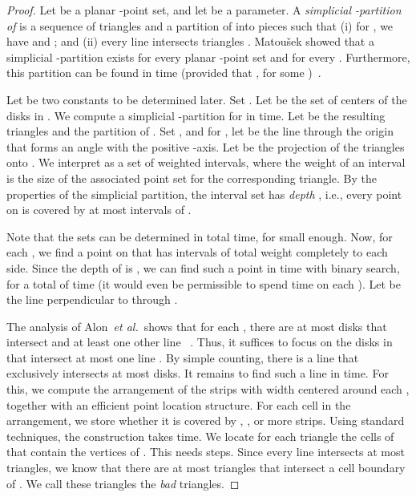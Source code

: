 \documentclass{paper}
\newcommand {\etal} {\textit {et al.}}
\begin{document}
\begin{proof}
Let  be a planar -point set, and let  be a parameter.
A \emph{simplicial -partition of } is 
a sequence  of 
 triangles and a partition  of  
into  pieces such
that  (i) for , we have 
and ; and (ii) every line  intersects 
 triangles .
Matou\v{s}ek showed that a simplicial -partition exists for every 
planar -point set and for every . 
Furthermore, this partition can be found in
 time (provided that , for 
some )~\cite[Theorem~4.7]{Matousek92}.

Let  be two constants to be determined later. Set 
. Let  be the set of centers of the disks in .
We compute a simplicial -partition for  in  time. 
Let  be the resulting triangles and
 the partition of .
Set , and for , let 
be the line through the origin that  forms an angle  with the 
positive -axis.
Let  be the projection of the triangles
 onto .
We interpret  as a set
of weighted intervals, where the weight of an interval is the size  of 
the associated point set for the corresponding triangle.
By the properties of the simplicial partition, the interval set  
has \emph{depth} ,
i.e., every point on  is covered by at most  intervals 
of .

Note that the sets  can be determined in  total time, for  small enough.
Now, for each  , we find a point  on  that has intervals of
total weight   completely to 
each side. Since the depth of
 is , we can find such a point in time  with
binary search, for a total of  time (it would even be
permissible to spend time  on each ). Let  be the line
perpendicular to  through .

The analysis of Alon~\etal\ shows that for each , there are at
most  disks that intersect  and at least one other line
~\cite[Section~2]{akp-cddsl-89}. Thus, it suffices to focus on the 
disks in  that intersect
at most one line . By simple counting, there is a line
 that exclusively intersects at most  disks. 
It remains to find such a line in  time. For this, we compute 
the arrangement  of the strips with width  centered
around each , together with an efficient point location 
structure. For each cell in the arrangement, we store whether it is covered
by , , or more strips. Using standard techniques, the construction 
takes  time. 
We locate for each triangle  the cells of 
that contain the vertices of . This needs 
 steps.
Since every line intersects at most  triangles,
we know that there are at most  
triangles that intersect a cell boundary of . We call these
triangles the \emph{bad} triangles.


\end{proof}
\end{document}

